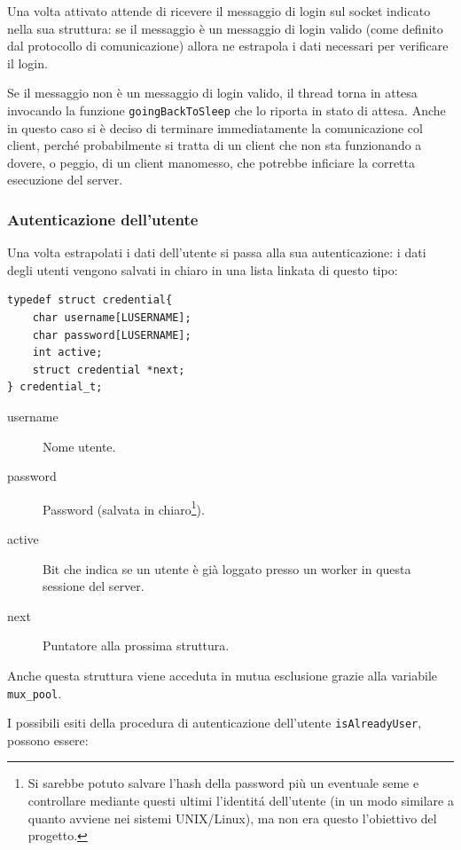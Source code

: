 \documentclass[a4paper,10pt]{article}
\begin{document}
Una volta attivato attende di ricevere il messaggio di login sul socket indicato nella sua struttura: se il messaggio \`e un messaggio di login valido (come definito dal protocollo di comunicazione) allora ne estrapola i dati necessari per verificare il login.

Se il messaggio non \`e un messaggio di login valido, il thread torna in attesa invocando la funzione \texttt{goingBackToSleep} che lo riporta in stato di attesa. Anche in questo caso si \`e deciso di terminare immediatamente la comunicazione col client, perch\'e probabilmente si tratta di un client che non sta funzionando a dovere, o peggio, di un client manomesso, che potrebbe inficiare la corretta esecuzione del server.

\subsubsection{Autenticazione dell'utente}

Una volta estrapolati i dati dell'utente si passa alla sua autenticazione:
i dati degli utenti vengono salvati in chiaro in una lista linkata di questo tipo:
\begin{verbatim}
typedef struct credential{
    char username[LUSERNAME];
    char password[LUSERNAME];
    int active;
    struct credential *next;
} credential_t;
\end{verbatim}
\begin{description}
	\item[username] Nome utente.
	\item[password] Password (salvata in chiaro\footnote{Si sarebbe potuto salvare l'hash della password pi\`u un eventuale seme e controllare mediante questi ultimi l'identit\'a dell'utente (in un modo similare a quanto avviene nei sistemi UNIX/Linux), ma non era questo l'obiettivo del progetto.}).
	\item[active] Bit che indica se un utente \`e gi\`a loggato presso un worker in questa sessione del server.
	\item[next] Puntatore alla prossima struttura.
\end{description}

Anche questa struttura viene acceduta in mutua esclusione grazie alla variabile \texttt{mux\_pool}.

I possibili esiti della procedura di autenticazione dell'utente \texttt{isAlreadyUser}, possono essere:
\end{document}
